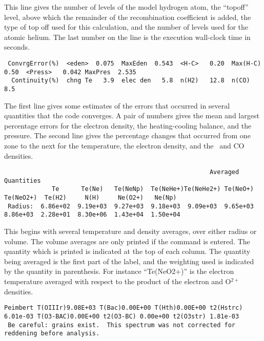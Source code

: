This line gives the number of levels of the model hydrogen atom, the
``topoff'' level, above which the remainder of the recombination coefficient
is added, the type of top off used for this calculation, and the number
of levels used for the atomic helium.
The last number on the line is the
execution wall-clock time in seconds.

{\setverbatimfontsize{\tiny}
\begin{verbatim}
 ConvrgError(%)  <eden>  0.075  MaxEden  0.543  <H-C>   0.20  Max(H-C)    0.50  <Press>   0.042 MaxPres  2.535
  Continuity(%)  chng Te   3.9  elec den   5.8  n(H2)   12.8  n(CO)        8.5
\end{verbatim}
}

The first line gives some estimates of the errors that occurred in several
quantities that the code converges.
A pair of numbers gives the mean and
largest percentage errors for the electron density, the heating-cooling
balance, and the pressure.
The second line gives the percentage changes
that occurred from one zone to the next for the temperature, the electron
density, and the \htwo\ and CO densities.

{\setverbatimfontsize{\tiny}
\begin{verbatim}
                                                        Averaged Quantities
             Te      Te(Ne)   Te(NeNp)  Te(NeHe+)Te(NeHe2+) Te(NeO+)  Te(NeO2+)  Te(H2)     N(H)     Ne(O2+)   Ne(Np)
 Radius:  6.86e+02  9.19e+03  9.27e+03  9.18e+03  9.09e+03  9.65e+03  8.86e+03  2.28e+01  8.30e+06  1.43e+04  1.50e+04
 \end{verbatim}
}

 This begins with several temperature and density averages, over either
radius or volume.
The volume averages are only printed if the
 command
is entered.
The quantity which is printed is indicated at the top of each
column.
The quantity being averaged is the first part of the label, and
the weighting used is indicated by the quantity in parenthesis.
For instance ``Te(NeO2+)'' is the electron temperature averaged
with respect to the product
of the electron and O$^{2+}$ densities.
{\setverbatimfontsize{\tiny}
\begin{verbatim}
Peimbert T(OIIIr)9.08E+03 T(Bac)0.00E+00 T(Hth)0.00E+00 t2(Hstrc) 6.01e-03 T(O3-BAC)0.00E+00 t2(O3-BC) 0.00e+00 t2(O3str) 1.81e-03
 Be careful: grains exist.  This spectrum was not corrected for reddening before analysis.
\end{verbatim}
}

